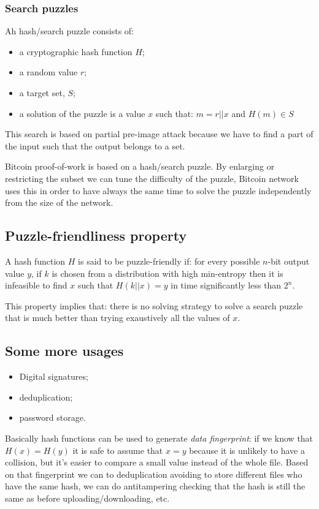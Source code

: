 \subsubsection{Search puzzles}
Ah hash/search puzzle consists of:
\begin{itemize}
    \item a cryptographic hash function $H$;
    \item a random value $r$;
    \item a target set, $S$;
    \item a solution of the puzzle is a value $x$ such that: $m = r || x$ and $H(m) \in S$
\end{itemize}
This search is based on partial pre-image attack because we have to find a part of the input such that the output belongs to a set.

Bitcoin proof-of-work is based on a hash/search puzzle.
By enlarging or restricting the subset we can tune the difficulty of the puzzle, Bitcoin network uses this in order to have always the same time to solve the puzzle independently from the size of the network.

\subsection{Puzzle-friendliness property}
A hash function $H$ is said to be puzzle-friendly if: for every possible $n$-bit output value $y$, if $k$ is chosen from a distribution with high min-entropy then it is infeasible to find $x$ such that $H(k || x) = y$ in time significantly less than $2^n$.

This property implies that: there is no solving strategy to solve a search puzzle that is much better than trying exaustively all the values of $x$.

\subsection{Some more usages}
\begin{itemize}
    \item Digital signatures;
    \item deduplication;
    \item password storage.
\end{itemize}
Basically hash functions can be used to generate \emph{data fingerprint}: if we know that $H(x) = H(y)$ it is safe to assume that $x = y$ because it is unlikely to have a collision, but it's easier to compare a small value instead of the whole file.
Based on that fingerprint we can to deduplication avoiding to store different files who have the same hash, we can do antitampering checking that the hash is still the same as before uploading/downloading, etc.

